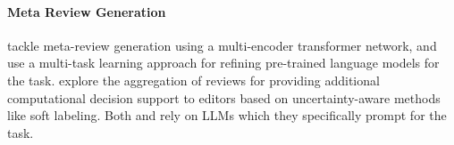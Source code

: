



\paragraph{Meta Review Generation}
\citet{9651825} tackle meta-review generation using a multi-encoder transformer network, and \citet{li-etal-2023-summarizing} use a multi-task learning approach for refining pre-trained language models for the task. \citet{stappen2020uncertainty} explore the aggregation of reviews for providing additional computational decision support to editors based on uncertainty-aware methods like soft labeling. Both \citet{zeng2023meta} and \citet{santu2024prompting} rely on %
LLMs 
which they specifically prompt for the task.



